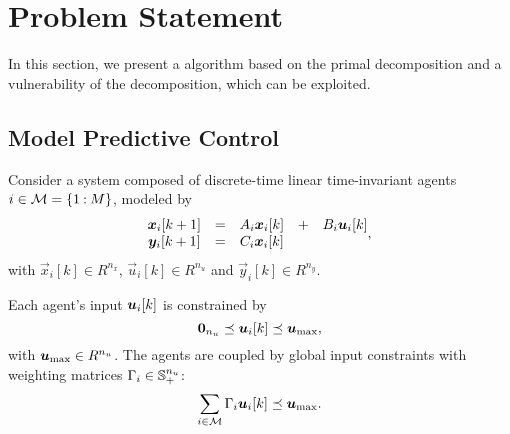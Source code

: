 \documentclass{ifacconf}  %
\begin{document}
\section{Problem Statement}\label{sec:PS}
In this section, we present a \dmpc{} algorithm based on the primal decomposition \citep{BoydEtAl2015} and a vulnerability of the decomposition, which can be exploited.

\subsection{Model Predictive Control}\label{ssec:MPC}
Consider a system composed of discrete-time linear time-invariant agents ${i\in\mathcal{M}=\{1\mathbin{:}M\}}$, modeled by
\begin{equation}
\begin{matrix}
  \label{eq:systems}
\vec{x}_{i}[k+1]&=&A_{i}\xik &+& B_{i}\uik\\
\vec{y}_{i}[k+1]&=&C_{i}\xik &&
\end{matrix},
\end{equation}
with ${\vec{x}_{i}[k]\in R^{n_{x}}}$, ${\vec{u}_{i}[k]\in R^{n_{u}}}$ and ${\vec{y}_{i}[k]\in R^{n_{y}}}$.

Each agent's input $\uik$ is constrained by
\begin{equation}
  \label{eq:u_local_constraints}
  \0_{n_{u}}\preceq\uik\preceq\vec{u}_{\max},
\end{equation}
with ${\boldsymbol{u}_{\mathrm{\max}}\in R^{n_{u}}}$.
The agents are coupled by global input constraints with weighting matrices ${\Gamma_{i}\in\mathbb{S}_{+}^{n_{u}}}$:
\begin{equation}
  \label{eq:global_constraint}
  \sum_{i\in\set{M}}\Gamma_{i}\uik\preceq\umax.
\end{equation}
\end{document}
